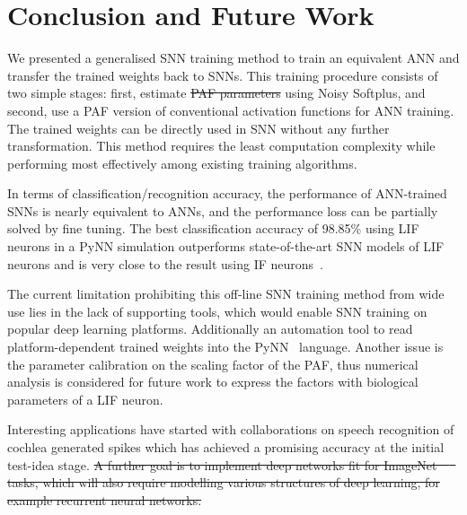 \documentclass{article}
\providecommand{\DIFaddtex}[1]{{\protect\color{blue}\uwave{#1}}} %
\providecommand{\DIFdeltex}[1]{{\protect\color{red}\sout{#1}}}                      %
\providecommand{\DIFaddbegin}{} %
\providecommand{\DIFaddend}{} %
\providecommand{\DIFdelbegin}{} %
\providecommand{\DIFdelend}{} %
\providecommand{\DIFadd}[1]{\texorpdfstring{\DIFaddtex{#1}}{#1}} %
\providecommand{\DIFdel}[1]{\texorpdfstring{\DIFdeltex{#1}}{}} %
\begin{document}
	\section{Conclusion and Future Work}
	We presented a generalised SNN training method to train an equivalent ANN and transfer the trained weights back to SNNs.
	This training procedure consists of two simple stages: first, estimate \DIFdelbegin \DIFdel{PAF parameters }\DIFdelend \DIFaddbegin \DIFadd{parameter $p$ for PAF }\DIFaddend using Noisy Softplus, and second, use a PAF version of conventional activation functions for ANN training. %
	The trained weights can be directly used in SNN without any further transformation.
	This method requires the least computation complexity while performing most effectively among existing training algorithms.

	In terms of classification/recognition accuracy, the performance of ANN-trained SNNs is nearly equivalent to ANNs, and the performance loss can be partially solved by fine tuning.
	The best classification accuracy of 98.85\% using LIF neurons in a PyNN simulation outperforms state-of-the-art SNN models of LIF neurons and is very close to the result using IF neurons~\cite{diehl2015fast}.

	The current limitation prohibiting this off-line SNN training method from wide use lies in the lack of supporting tools, which would enable SNN training on popular deep learning platforms. Additionally an automation tool to read platform-dependent trained weights into the PyNN~\cite{davison2008pynn} language.
	Another issue is the parameter calibration on the scaling factor of the PAF, thus numerical analysis is considered for future work to express the factors with biological parameters of a LIF neuron.
	\DIFdelbegin %

\DIFdelend Interesting applications have started with collaborations on speech recognition of cochlea generated spikes which has achieved a promising accuracy at the initial test-idea stage.
\DIFdelbegin \DIFdel{A further goal is to implement deep networks fit for ImageNet~\mbox{%
\cite{deng2009imagenet}
}%
tasks, which will also require modelling various structures of deep learning, for example recurrent neural networks.
}\DIFdelend %
\end{document}
